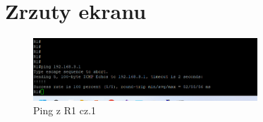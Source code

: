\documentclass[12pt,twoside,a4paper,openany]{article}
\begin{document}

\clearpage
\section{Zrzuty ekranu}

\begin{figure}[h!]
    \centering
    \includegraphics[width=0.75\textwidth]{routery/R1/ping1.png}
    \caption{Ping z R1 cz.1}
    \label{fig:adresacja_ip}
\end{figure}
\end{document}
